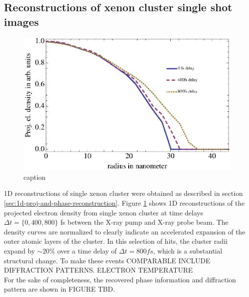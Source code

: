 \subsection{Reconstructions of xenon cluster single shot images}
\begin{figure}
	\centering
		\includegraphics[width=1.00\textwidth]{images/results/Xe-reconstructions.eps}
	\caption{caption}
	\label{fig:Xe-reconstructions}
\end{figure}
1D reconstructions of single xenon cluster were obtained as described in section \ref{sec:1d-proj-and-phase-reconstruction}. Figure \ref{fig:Xe-reconstructions} shows 1D reconstructions of the projected electron density from single xenon cluster at time delays $\Delta t=\{0, 400, 800\}$ fs between the X-ray pump and X-ray probe beam. The density curves are normalized to clearly indicate an accelerated expansion of the outer atomic layers of the cluster. In this selection of hits, the cluster radii expand by $\sim 20\%$ over a time delay of $\Delta t=800 fs$, which is a substantial structural change. To make these events COMPARABLE INCLUDE DIFFRACTION PATTERNS. ELECTRON TEMPERATURE\\
For the sake of completeness, the recovered phase information and diffraction pattern are shown in FIGURE TBD.\\
%
